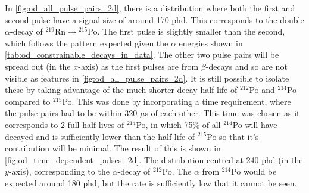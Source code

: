 

\par
In \autoref{fig:od_all_pulse_pairs_2d}, there is a distribution where both the first and second pulse have a signal size of around 170 phd.
This corresponds to the double $\alpha$-decay of ${}^{219}$Rn$\to{}^{215}$Po.
The first pulse is slightly smaller than the second, which follows the pattern expected given the $\alpha$ energies shown in \autoref{tab:od_constrainable_decays_in_data}.
The other two pulse pairs will be spread out (in the $x$-axis) as the first pulses are from $\beta$-decays and so are not visible as features in \autoref{fig:od_all_pulse_pairs_2d}.
It is still possible to isolate these by taking advantage of the much shorter decay half-life of ${}^{212}$Po and ${}^{214}$Po compared to ${}^{215}$Po.
This was done by incorporating a time requirement, where the pulse pairs had to be within 320 $\mu$s of each other.
This time was chosen as it corresponds to 2 full half-lives of ${}^{214}$Po, in which 75\% of all ${}^{214}$Po will have decayed and is sufficiently lower than the half-life of ${}^{215}$Po so that it's contribution will be minimal.
The result of this is shown in \autoref{fig:od_time_dependent_pulses_2d}.
The distribution centred at 240 phd (in the $y$-axis), corresponding to the $\alpha$-decay of ${}^{212}$Po.
The $\alpha$ from ${}^{214}$Po would be expected around 180 phd, but the rate is sufficiently low that it cannot be seen.

